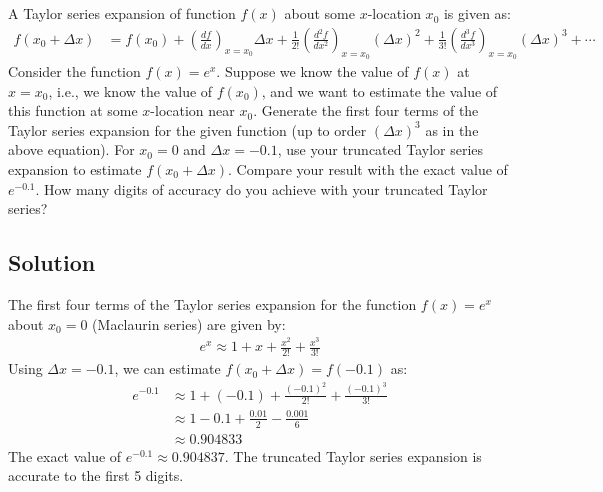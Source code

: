 \section{}
A Taylor series expansion of function $f(x)$ about some $x$-location $x_0$ is given as:
\begin{align*}
    f(x_0 + \Delta x) &= f(x_0) + \left(\frac{df}{dx}\right)_{x=x_0} \Delta x + \frac{1}{2!} \left(\frac{d^2f}{dx^2}\right)_{x=x_0} (\Delta x)^2 + \frac{1}{3!} \left(\frac{d^3f}{dx^3}\right)_{x=x_0} (\Delta x)^3 + \cdots
\end{align*}
Consider the function $f(x) = e^x$. Suppose we know the value of $f(x)$ at $x = x_0$, i.e., we know the value of $f(x_0)$, and we want to estimate the value of this function at some $x$-location near $x_0$. Generate the first four terms of the Taylor series expansion for the given function (up to order $(\Delta x)^3$ as in the above equation). For $x_0 = 0$ and $\Delta x = -0.1$, use your truncated Taylor series expansion to estimate $f(x_0 + \Delta x)$. Compare your result with the exact value of $e^{-0.1}$. How many digits of accuracy do you achieve with your truncated Taylor series?

\subsection*{Solution}
The first four terms of the Taylor series expansion for the function $f(x) = e^x$ about $x_0 = 0$ (Maclaurin series) are given by:
\begin{align*}
    e^{x} \approx 1 + x + \frac{x^2}{2!} + \frac{x^3}{3!}
\end{align*}
Using $\Delta x = -0.1$, we can estimate $f(x_0 + \Delta x) = f(-0.1)$ as:
\begin{align*}
    e^{-0.1} &\approx 1 + (-0.1) + \frac{(-0.1)^2}{2!} + \frac{(-0.1)^3}{3!} \\
    &\approx 1 - 0.1 + \frac{0.01}{2} - \frac{0.001}{6} \\
    &\approx \boxed{0.904833}
\end{align*}
The exact value of $e^{-0.1} \approx 0.904837$. The truncated Taylor series expansion is accurate to the first 5 digits. 